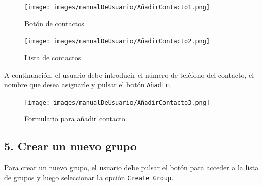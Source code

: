 \begin{figure}[H]
    \centering
    \begin{minipage}[b]{0.48\textwidth}
        \centering
        \texttt{[image: images/manualDeUsuario/AñadirContacto1.png]}
        \caption*{Botón de contactos}
    \end{minipage}
    \hfill
    \begin{minipage}[b]{0.48\textwidth}
        \centering
        \texttt{[image: images/manualDeUsuario/AñadirContacto2.png]}
        \caption*{Lista de contactos}
    \end{minipage}
\end{figure}

A continuación, el usuario debe introducir el número de teléfono del contacto, el nombre que desea asignarle y pulsar el botón \texttt{Añadir}.

\begin{figure}[H]
    \centering
    \texttt{[image: images/manualDeUsuario/AñadirContacto3.png]}
    \caption*{Formulario para añadir contacto}
\end{figure}

\subsection*{5. Crear un nuevo grupo}
Para crear un nuevo grupo, el usuario debe pulsar el botón para acceder a la lista de grupos y luego seleccionar la opción \texttt{Create Group}.

